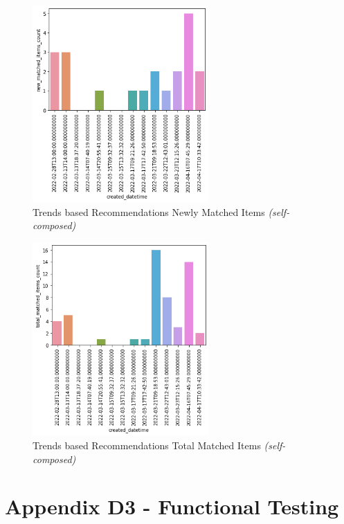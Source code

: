 \begin{figure}[h!]
\centering
\includegraphics[width=0.6\textwidth]{images/Testing/trends/new_matched_items_per_day.png}
\caption{Trends based Recommendations Newly Matched Items \textit{(self-composed)}}
\label{fig:trends-recsys-trends-new-matches}
\end{figure}

\begin{figure}[h!]
\centering
\includegraphics[width=0.6\textwidth]{images/Testing/trends/total_matched_items_per_day.png}
\caption{Trends based Recommendations Total Matched Items \textit{(self-composed)}}
\label{fig:trends-recsys-trends-total-matches}
\end{figure}

\clearpage
\section*{Appendix D3 - Functional Testing}

